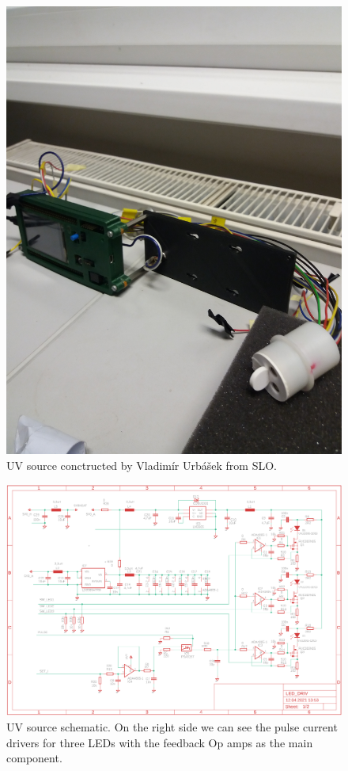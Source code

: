  \begin{figure}[H]
 \centering
 \includegraphics[scale=0.09, angle = 270, origin = c]{./pictures/KarlsRuhe}
 \caption{UV source conctructed by Vladimír Urbášek from SLO.}
 \label{UVsource}
\end{figure}

 \begin{figure}[H]
 \centering
 \includegraphics[scale=0.5, angle = 0, origin = c]{./pictures/OrigScheme.png}
 \caption{UV source schematic. On the right side we can see the pulse current drivers for three LEDs with the feedback Op amps as the main component.}
 \label{UVsource}
\end{figure}


